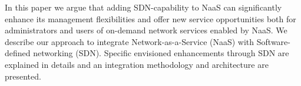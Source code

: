In this paper we argue that adding SDN-capability to NaaS can significantly enhance
its management flexibilities and offer new service opportunities both for
administrators and users of on-demand network services enabled by NaaS. We
describe our approach to integrate Network-as-a-Service (NaaS) with
Software-defined networking (SDN). Specific envisioned
enhancements through SDN are explained in details and an integration
methodology and architecture are presented.

%
%
